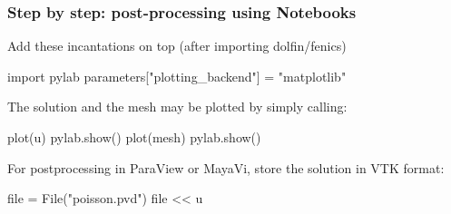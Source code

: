 \begin{frame}[fragile]
  \frametitle{Step by step: post-processing using Notebooks}

  Add these incantations on top (after importing dolfin/fenics)
  \vspace{-1em}
  \begin{python}
import pylab
parameters["plotting_backend"] = "matplotlib"
    \end{python}

  The solution and the mesh may be plotted by simply calling:
  \vspace{-1em}
  \begin{python}
plot(u)
pylab.show()
plot(mesh)
pylab.show()
  \end{python}

  For postprocessing in ParaView or MayaVi, store the solution in VTK
  format:
  \vspace{-1em}
  \begin{python}
file = File("poisson.pvd")
file << u
  \end{python}

\end{frame}
